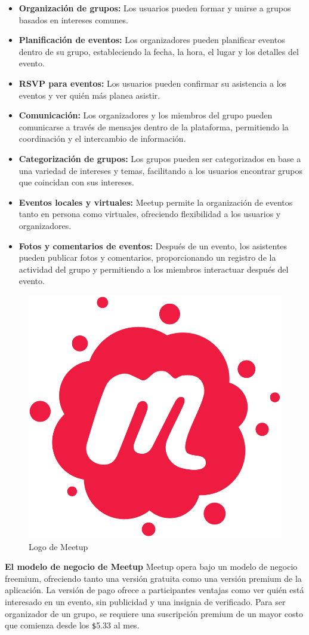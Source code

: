 \begin{itemize}
  \item \textbf{Organización de grupos:} Los usuarios pueden formar y unirse a grupos basados en intereses comunes.
  \item \textbf{Planificación de eventos:} Los organizadores pueden planificar eventos dentro de su grupo, estableciendo 
  la fecha, la hora, el lugar y los detalles del evento.
  \item \textbf{RSVP para eventos:} Los usuarios pueden confirmar su asistencia a los eventos y ver quién más planea asistir.
  \item \textbf{Comunicación:} Los organizadores y los miembros del grupo pueden comunicarse a través de mensajes dentro de 
  la plataforma, permitiendo la coordinación y el intercambio de información.
  \item \textbf{Categorización de grupos:} Los grupos pueden ser categorizados en base a una variedad de intereses y 
  temas, facilitando a los usuarios encontrar grupos que coincidan con sus intereses.
  \item \textbf{Eventos locales y virtuales:} Meetup permite la organización de eventos tanto en persona como virtuales, 
  ofreciendo flexibilidad a los usuarios y organizadores.
  \item \textbf{Fotos y comentarios de eventos:} Después de un evento, los asistentes pueden publicar fotos y 
  comentarios, proporcionando un registro de la actividad del grupo y permitiendo a los miembros interactuar después del evento.
\end{itemize}
\begin{figure}[H]
        \centering
        \includegraphics[width=0.3\linewidth]{images/Meetup_Logo.png}
        \caption{Logo de Meetup}
        \label{fig:meetup_logo}
    \end{figure}

\textbf{El modelo de negocio de Meetup}
Meetup opera bajo un modelo de negocio freemium, ofreciendo tanto una versión gratuita como una versión premium de la aplicación.
La versión de pago ofrece a participantes ventajas como ver quién está interesado en un evento, sin publicidad  y una insignia de verificado.
Para ser organizador de un grupo, se requiere una suscripción premium de un mayor costo que comienza desde los \verb|$|5.33 al mes.

